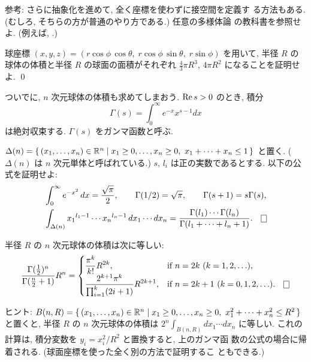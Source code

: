 \documentclass[12pt,twoside]{jarticle}
\def\R{{\Bbb R}} %
\def\Repart{\mathop{\text{\rm Re}}\nolimits} %
\begin{document}
\smallskip

\noindent 参考: さらに抽象化を進めて, 全く座標を使わずに接空間を定義す
る方法もある. (むしろ, そちらの方が普通のやり方である.) 任意の多様体論
の教科書を参照せよ. (例えば, \cite{Matsushima}.)

\begin{question}
  球座標 %
  \(
    (x,y,z)
    =
    (r\cos\phi\,\cos\theta,\; 
     r\cos\phi\,\sin\theta,\; 
     r\sin\phi)
  \) %
  を用いて, 半径 $R$ の球体の体積と半径 $R$ の球面の面積がそれぞれ %
  $\displaystyle \frac{4}{3}\pi R^3$, %
  $\displaystyle 4 \pi R^2$ %
  になることを証明せよ. \qed
\end{question}

ついでに, $n$ 次元球体の体積も求めてしまおう. $\Repart s > 0$ のとき, 
積分
\[
  \Gamma(s) = \int_0^\infty e^{-x} x^{s-1} dx
\]
は絶対収束する. $\Gamma(s)$ をガンマ函数と呼ぶ. 

\begin{question}
  \(
    \Delta(n)
    =
    \{\, (x_1,\dots,x_n)\in\R^n 
    \mid  x_1 \ge 0, \dots, x_n \ge 0,\ x_1 + \dots + x_n \le 1
    \,\}
  \) と置く. %
  ($\Delta(n)$ は $n$ 次元単体と呼ばれている.) %
  $s$, $l_i$ は正の実数であるとする. 以下の公式を証明せよ:
  \begin{align*}
    & 
    \int_0^\infty e^{-x^2}\,dx = \frac{\sqrt{\pi}}{2},
    \qquad
    \Gamma(1/2) = \sqrt{\pi}, 
    \qquad
    \Gamma(s+1) = s \Gamma(s),
    \\
    &
    \int_{\Delta(n)}
    x_1{}^{l_1-1} \cdots x_n{}^{l_n-1} \,dx_1\cdots dx_n
    =
    \frac{\Gamma(l_1)\cdots\Gamma(l_n)}
         {\Gamma(l_1 + \dots + l_n + 1)}.
  \qed
  \end{align*}
\end{question}

\begin{question}
  半径 $R$ の $n$ 次元球体の体積は次に等しい:
  \[
    \frac{\Gamma(\frac{1}{2})^n}{\Gamma(\frac{n}{2}+1)} R^n
    =
    \begin{cases}
      \displaystyle
      \frac{\pi^k}{k!} R^{2k},
      & \text{if $n = 2k$ ($k=1,2,\ldots$)},
      \\
      \displaystyle
      \frac{2^{k+1}\pi^k }{\prod_{i=1}^k(2i+1)}R^{2k+1}, 
      & \text{if $n = 2k+1$ ($k=0,1,2,\ldots$)}.
    \qed
    \end{cases}
  \]
\end{question}

\noindent ヒント: %
\(
  B(n,R)
  =
  \{\, (x_1,\dots,x_n)\in\R^n 
  \mid  x_1 \ge 0, \dots, x_n \ge 0,\ x_1^2 + \dots + x_n^2 \le R^2
  \,\}
\) と置くと, 半径 $R$ の $n$ 次元球体の体積は %
$2^n \int_{B(n,R)} dx_1\cdots dx_n$ に等しい. %
これの計算は, 積分変数を $y_i = x_i^2/R^2$ と置換すると, 上のガンマ函
数の公式の場合に帰着される. (球面座標を使った全く別の方法で証明するこ
ともできる.)
\end{document}

